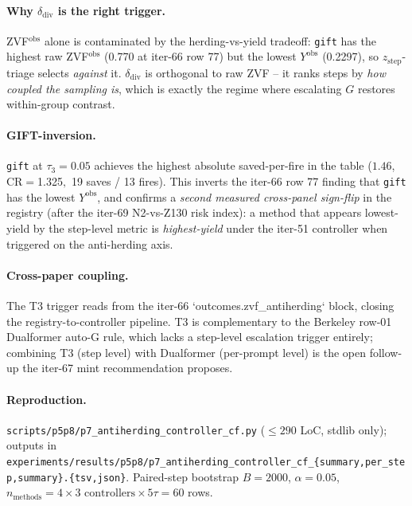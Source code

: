 \paragraph{Why $\delta_{\mathrm{div}}$ is the right trigger.}
ZVF$^{\mathrm{obs}}$ alone is contaminated by the herding-vs-yield
tradeoff: \texttt{gift} has the highest raw ZVF$^{\mathrm{obs}}$ (0.770
at iter-66 row 77) but the lowest $Y^{\mathrm{obs}}$ (0.2297), so
$z_{\mathrm{step}}$-triage selects \emph{against} it.
$\delta_{\mathrm{div}}$ is orthogonal to raw ZVF -- it ranks steps by
\emph{how coupled the sampling is}, which is exactly the regime where
escalating $G$ restores within-group contrast.

\paragraph{GIFT-inversion.}
\texttt{gift} at $\tau_3{=}0.05$ achieves the highest absolute
saved-per-fire in the table ($1.46$, CR$=$1.325$,$ 19 saves / 13 fires).
This inverts the iter-66 row 77 finding that \texttt{gift} has the lowest
$Y^{\mathrm{obs}}$, and confirms a \emph{second measured cross-panel
sign-flip} in the registry (after the iter-69 N2-vs-Z130 risk index):
a method that appears lowest-yield by the step-level metric is
\emph{highest-yield} under the iter-51 controller when triggered on the
anti-herding axis.

\paragraph{Cross-paper coupling.}
The T3 trigger reads from the iter-66 `outcomes.zvf\_antiherding` block,
closing the registry-to-controller pipeline. T3 is complementary to the
Berkeley row-01 Dualformer auto-G rule, which lacks a step-level
escalation trigger entirely; combining T3 (step level) with Dualformer
(per-prompt level) is the open follow-up the iter-67 mint
recommendation proposes.

\paragraph{Reproduction.}
\texttt{scripts/p5p8/p7\_antiherding\_controller\_cf.py}
($\leq 290$ LoC, stdlib only); outputs in
\texttt{experiments/results/p5p8/p7\_antiherding\_controller\_cf\_\{summary,per\_step,summary\}.\{tsv,json\}}.
Paired-step bootstrap $B{=}2000$, $\alpha{=}0.05$,
$n_{\mathrm{methods}}{=}4 \times 3 \text{ controllers} \times 5 \tau = 60$ rows.

